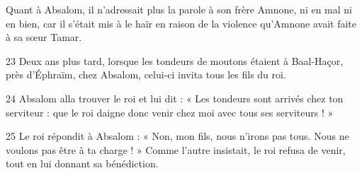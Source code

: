 Quant à Absalom, il n’adressait plus la parole à son frère Amnone, ni en mal ni en bien, car il s’était mis à le haïr en raison de la violence qu’Amnone avait faite à sa sœur Tamar.

23 Deux ans plus tard, lorsque les tondeurs de moutons étaient à Baal-Haçor, près d’Éphraïm, chez Absalom, celui-ci invita tous les fils du roi.

24 Absalom alla trouver le roi et lui dit : « Les tondeurs sont arrivés chez ton serviteur : que le roi daigne donc venir chez moi avec tous ses serviteurs ! »

25 Le roi répondit à Absalom : « Non, mon fils, nous n’irons pas tous. Nous ne voulons pas être à ta charge ! » Comme l’autre insistait, le roi refusa de venir, tout en lui donnant sa bénédiction.
